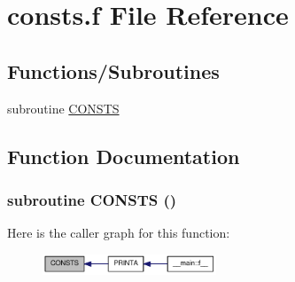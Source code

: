 \hypertarget{consts_8f}{
\section{consts.f File Reference}
\label{consts_8f}
}
\subsection*{Functions/Subroutines}
\begin{DoxyCompactItemize}
\item 
subroutine \hyperlink{consts_8f_aa48422d747cfa0ff8a558c94db1f648d}{CONSTS}
\end{DoxyCompactItemize}


\subsection{Function Documentation}
\hypertarget{consts_8f_aa48422d747cfa0ff8a558c94db1f648d}{
\subsubsection[{CONSTS}]{\setlength{\rightskip}{0pt plus 5cm}subroutine CONSTS ()}}
\label{consts_8f_aa48422d747cfa0ff8a558c94db1f648d}


Here is the caller graph for this function:\nopagebreak
\begin{figure}[H]
\begin{center}
\leavevmode
\includegraphics[width=147pt]{consts_8f_aa48422d747cfa0ff8a558c94db1f648d_icgraph}
\end{center}
\end{figure}
